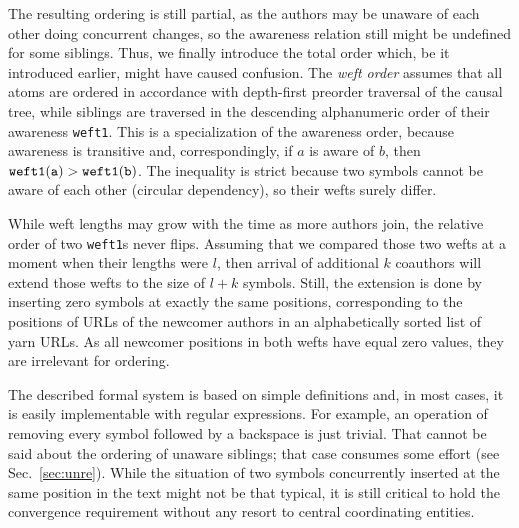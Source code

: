 \documentclass{acm_proc_article-sp}
\begin{document}
The resulting ordering is still partial, as the authors
may be unaware of each other doing concurrent changes, so
the awareness relation still might be undefined for some
siblings. Thus, we finally introduce the total order
which, be it introduced earlier, might have caused confusion.
The \emph{weft order} assumes that all atoms are ordered in
accordance with depth-first preorder traversal of the causal
tree, while siblings are traversed in the descending 
alphanumeric order of their awareness {\tt weft1}.
This is a specialization of the awareness order, because
awareness is transitive and, correspondingly, if $a$ is
aware of $b$, then $\tt weft1(a) > weft1(b)$. The inequality is
strict because two symbols cannot be aware of each other
(circular dependency), so their wefts surely differ.

While weft lengths may grow with the time as more authors
join, the relative order of two {\tt weft1}s never flips.
Assuming that we compared those two wefts at a moment when
their lengths were $l$, then arrival of additional $k$ coauthors
will extend those wefts to the size of $l+k$ symbols. Still,
the extension is done by inserting zero symbols at exactly
the same positions, corresponding to the positions of URLs
of the newcomer authors in an alphabetically sorted list
of yarn URLs. As all newcomer positions in both wefts have
equal zero values, they are irrelevant for ordering.

The described formal system is based on simple definitions
and, in most cases, it is easily implementable with regular
expressions. For example, an operation of removing every
symbol followed by a backspace is just trivial. That cannot
be said about the ordering of unaware siblings; that
case consumes some effort (see Sec.~\ref{sec:unre}). While the
situation of two symbols concurrently inserted at the same position
in the text might not be that typical, it is still critical
to hold the convergence requirement without any resort to
central coordinating entities. 
\end{document}
